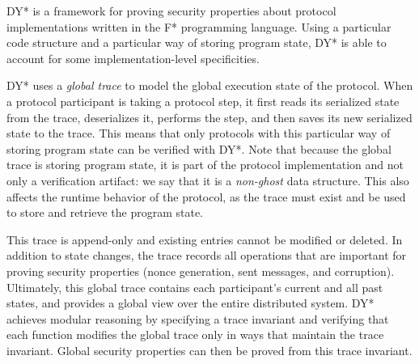 DY*\cite{} is a framework for proving security properties about protocol implementations written in the F* programming language.
Using a particular code structure and a particular way of storing program state, DY* is able to account for some implementation-level specificities.

DY* uses a \emph{global trace} to model the global execution state of the protocol.
When a protocol participant is taking a protocol step, it first reads its serialized state from the trace, deserializes it, performs the step, and then saves its new serialized state to the trace.
This means that only protocols with this particular way of storing program state can be verified with DY*.
Note that because the global trace is storing program state, it is part of the protocol implementation and not only a verification artifact: we say that it is a \emph{non-ghost} data structure.
This also affects the runtime behavior of the protocol, as the trace must exist and be used to store and retrieve the program state.

This trace is append-only and existing entries cannot be modified or deleted. In addition to state changes, the trace records all operations that are important for proving security properties (nonce generation, sent messages, and corruption).
Ultimately, this global trace contains each participant's current and all past states, and provides a global view over the entire distributed system. %
DY* achieves modular reasoning by specifying a trace invariant and verifying that each function modifies the global trace only in ways that maintain the trace invariant. Global security properties can then be proved from this trace invariant.

